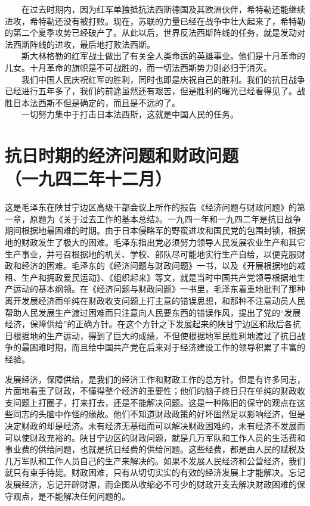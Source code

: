 \documentclass[cn,11pt,chinese]{elegantbook}
\def\myformat#1{\hfil\hfil #1}
\begin{document}
　　在过去时期内，因为红军单独抵抗法西斯德国及其欧洲伙伴，希特勒还能继续进攻，希特勒还没有被打败。现在，苏联的力量已经在战争中壮大起来了，希特勒的第二个夏季攻势已经破产了。从此以后，世界反法西斯阵线的任务，就是发动对法西斯阵线的进攻，最后地打败法西斯。\\
　　斯大林格勒的红军战士做出了有关全人类命运的英雄事业。他们是十月革命的儿女。十月革命的旗帜是不可战胜的，而一切法西斯势力则必归于消灭。\\
　　我们中国人民庆祝红军的胜利，同时也即是庆祝自己的胜利。我们的抗日战争已经进行五年多了，我们的前途虽然还有艰苦，但是胜利的曙光已经看得见了。战胜日本法西斯不但是确定的，而且是不远的了。\\
　　一切努力集中于打击日本法西斯，这就是中国人民的任务。\\
\newpage\section*{\myformat{抗日时期的经济问题和财政问题}\\\myformat{（一九四二年十二月）}}
\begin{introduction}\item  这是毛泽东在陕甘宁边区高级干部会议上所作的报告《经济问题与财政问题》的第一章，原题为《关于过去工作的基本总结》。一九四一年和一九四二年是抗日战争期间根据地最困难的时期。由于日本侵略军的野蛮进攻和国民党的包围封锁，根据地的财政发生了极大的困难。毛泽东指出党必须努力领导人民发展农业生产和其它生产事业，并号召根据地的机关、学校、部队尽可能地实行生产自给，以便克服财政和经济的困难。毛泽东的《经济问题与财政问题》一书，以及《开展根据地的减租、生产和拥政爱民运动》、《组织起来》等文，就是当时中国共产党领导根据地生产运动的基本纲领。在《经济问题与财政问题》一书里，毛泽东着重地批判了那种离开发展经济而单纯在财政收支问题上打主意的错误思想，和那种不注意动员人民帮助人民发展生产渡过困难而只注意向人民要东西的错误作风，提出了党的“发展经济，保障供给”的正确方针。在这个方针之下发展起来的陕甘宁边区和敌后各抗日根据地的生产运动，得到了巨大的成绩，不但使根据地军民胜利地渡过了抗日战争的最困难时期，而且给中国共产党在后来对于经济建设工作的领导积累了丰富的经验。\end{introduction}
发展经济，保障供给，是我们的经济工作和财政工作的总方针。但是有许多同志，片面地看重了财政，不懂得整个经济的重要性；他们的脑子终日只在单纯的财政收支问题上打圈子，打来打去，还是不能解决问题。这是一种陈旧的保守的观点在这些同志的头脑中作怪的缘故。他们不知道财政政策的好坏固然足以影响经济，但是决定财政的却是经济。未有经济无基础而可以解决财政困难的，未有经济不发展而可以使财政充裕的。陕甘宁边区的财政问题，就是几万军队和工作人员的生活费和事业费的供给问题，也就是抗日经费的供给问题。这些经费，都是由人民的赋税及几万军队和工作人员自己的生产来解决的。如果不发展人民经济和公营经济，我们就只有束手待毙。财政困难，只有从切切实实的有效的经济发展上才能解决。忘记发展经济，忘记开辟财源，而企图从收缩必不可少的财政开支去解决财政困难的保守观点，是不能解决任何问题的。\\
\end{document}
